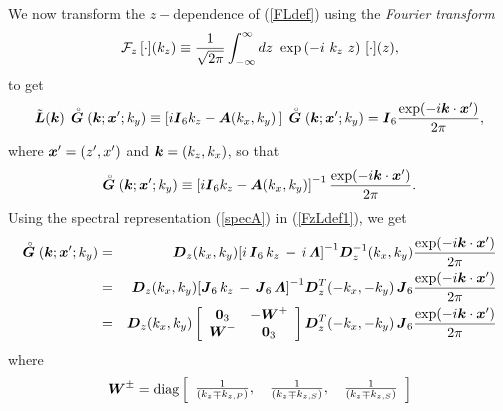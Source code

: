 


We now transform the $z-$dependence of  (\ref{FLdef}) using
the {\em  Fourier transform\/} 
\[
{\cal F}_{z}\, 
[\cdot] ({k}_{z}) \equiv \frac{1}{\sqrt{2 \pi}}\int_{-\infty }^{ \infty } 
dz\ \exp \left({-i\ {k}_{z}\ z}\right)\, [\cdot] (z) ,\]
 to get
\begin{equation}	\label{FzLdef}
	\tilde{\bmi  L}({\bmi k}) \,\rf{\bmi  G}({\bmi k};{\bmi x}^{\prime};k_y) \equiv \left[i 
{\bmi  I}_6 {k}_{z} -{\bmi 
A}({k}_{x},{k}_{y})\,  
	\right]\,\rf{\bmi  G}({\bmi k};{\bmi x}^{\prime};k_y)={\bmi  I}_{6} 	
	\frac{\exp({-i {\bmi k}\cdot {\bmi x}^{\prime}})}{{2 \pi}},
\end{equation}
where ${\bmi x}^{\prime}=(z^{\prime},x^{\prime})$ and  ${\bmi 
k}=(k_{z},k_{x})$, so that
\begin{equation}	\label{FzLdef1}
	\rf{\bmi  G}({\bmi k};{\bmi x}^{\prime};k_y) \equiv
	\left[i {\bmi  I}_6 {k}_{z} -{\bmi  A}({k}_{x},{k}_{y}) \right]^{-1} 
	\frac{\exp({-i {\bmi k}\cdot {\bmi x}^{\prime}})}{{2 \pi}}.
\end{equation}
Using the spectral representation (\ref{specA}) in  (\ref{FzLdef1}), 
we get 
\begin{eqnarray} \label{InvLDef0}
\rf{\bmi  G}({\bmi k};{\bmi x}^{\prime};k_y) 
&=&{\bmi  D}_{z}({k}_{x},{k}_{y}) 
{\left[i\, {\bmi  I}_{6}\, {k}_{z}\, -\, i\,   {\bmi \Lambda} \right]}^{-1}
{\bmi  D}_{z}^{-1}({k}_{x},{k}_{y}) \frac{\exp({-i {\bmi k}\cdot {\bmi x}^{\prime}})}{2 \pi}
\nonumber\\
&=&{\bmi  D}_{z}({k}_{x},{k}_{y}) 
{\left[{\bmi  J}_{6}\, {k}_{z}\, - \,{\bmi  J}_{6}\, {\bmi \Lambda} 
\right]}^{-1}
{\bmi  D}_{z}^{T}(-{k}_{x},-{k}_{y})\,{\bmi  J}_6
\frac{\exp(-i {\bmi k}\cdot {\bmi x}^{\prime})}{2 \pi}\nonumber\\
&=&{\bmi  D}_{z}({k}_{x},{k}_{y})
\left[{\begin{array}{cc}{\bf 0}_{3}&-{\bmi W}^{+}\\
{\bmi W}^{-}&{\bf 0}_{3}\end{array}}\right]
{\bmi  
D}_{z}^{T}(-{k}_{x},-{k}_{y})
\,{\bmi  J}_6 \frac{\exp(-i {\bmi k}\cdot {\bmi x}^{\prime})}{{2 \pi}}
\end{eqnarray} 
where
\[
{\bmi W}^{\pm}=\mbox{diag}
\left[\begin{array}{ccc}
\frac{1}{({k}_{z}\mp{k}_{z,P })},\,&\frac{1}{({k}_{z}\mp{k}_{z,S 
})},\,&\frac{1}{({k}_{z}\mp{k}_{z,S })}\end{array}\right]
\]



